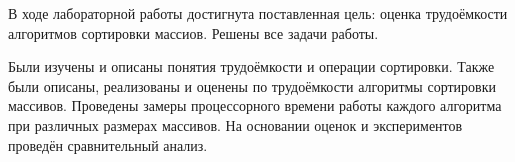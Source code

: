 В ходе лабораторной работы достигнута поставленная цель: оценка трудоёмкости алгоритмов сортировки массиов. Решены все задачи работы.

Были изучены и описаны понятия трудоёмкости и операции сортировки. Также были описаны, реализованы и оценены по трудоёмкости алгоритмы сортировки массивов. Проведены замеры процессорного времени работы каждого алгоритма при различных размерах массивов. На основании оценок и экспериментов проведён сравнительный анализ.